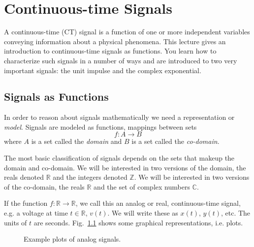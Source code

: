 \chapter{Continuous-time Signals}

A continuous-time (CT) signal  is a function of one or more independent variables conveying information about a physical phenomena. This lecture gives an introduction to continuous-time signals as functions. You learn how to characterize such signals in a number of ways and are introduced to two very important signals: the unit impulse and the complex exponential.

\section{Signals as Functions}

In order to reason about signals mathematically we need a representation or {\it model}. Signals are modeled as functions, mappings between sets
\[
f: A \rightarrow B
\]
where $A$ is a set called the {\it domain} and $B$ is a set called the {\it co-domain}.

The most basic classification of signals depends on the sets that makeup the domain and co-domain. We will be interested in two versions of the domain, the reals denoted $\mathbb{R}$ and the integers denoted $\mathbb{Z}$. We will be interested in two versions of the co-domain, the reals $\mathbb{R}$ and the set of complex numbers $\mathbb{C}$.

\begin{definition}
  If the function $f: \mathbb{R} \rightarrow \mathbb{R}$, we call this an analog or real, continuous-time signal, e.g. a voltage at time $t \in \mathbb{R}$, $v(t)$. We will write these as $x(t)$, $y(t)$, etc. The units of $t$ are seconds. Fig.~\ref{fig:ctplots} shows some graphical representations, i.e. plots.
\end{definition}

\begin{figure}[ht]
  \begin{center}
  \end{center}
  \caption{Example plots of analog signals.}
  \label{fig:ctplots}
\end{figure}

